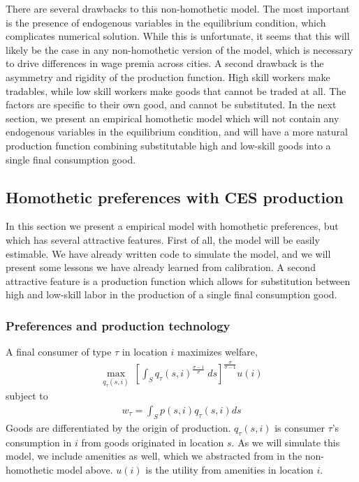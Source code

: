 \documentclass{article}
\begin{document}
There are several drawbacks to this non-homothetic model.  The most important is the presence of endogenous variables in the equilibrium condition, which complicates numerical solution.  While this is unfortunate, it seems that this will likely be the case in any non-homothetic version of the model, which is necessary to drive differences in wage premia across cities.  A second drawback is the asymmetry and rigidity of the production function.  High skill workers make tradables, while low skill workers make goods that cannot be traded at all.  The factors are specific to their own good, and cannot be substituted.  In the next section, we present an empirical homothetic model which will not contain any endogenous variables in the equilibrium condition, and will have a more natural production function combining substitutable high and low-skill goods into a single final consumption good. 

\subsection{Homothetic preferences with CES production}

In this section we present a empirical model with homothetic preferences, but which has several attractive features.  First of all, the model will be easily estimable.  We have already written code to simulate the model, and we will present some lessons we have already learned from calibration.  A second attractive feature is a production function which allows for substitution between high and low-skill labor in the production of a single final consumption good.

\subsubsection{Preferences and production technology}
A final consumer of type $\tau$ in location $i$ maximizes welfare,
\begin{eqnarray}
	\max \limits_{q_{\tau}(s,i)} ~
	\left[\int_S q_{\tau}(s,i)^{\frac{\sigma - 1}{\sigma}}~ ds\right]^{\frac{\sigma}{\sigma-1}} u(i) \nonumber
\end{eqnarray} 
subject to
\begin{eqnarray}
	w_{\tau} = \int_S p(s,i)q_\tau(s,i) ds  \nonumber
\end{eqnarray}
Goods are differentiated by the origin of production. $q_{\tau}(s,i)$ is consumer $\tau$'s consumption in $i$ from goods originated in location $s$. As we will simulate this model, we include amenities as well, which we abstracted from in the non-homothetic model above.  $u(i)$ is the utility from amenities in location $i$.
\end{document}
